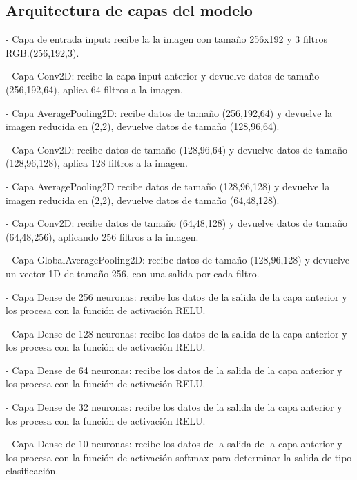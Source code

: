 \documentclass[colorinlistoftodos,twoside,twocolumn,10pt]{article} %
\begin{document}
\subsection{Arquitectura de capas del modelo}
- Capa de entrada input: recibe la la imagen con tamaño 256x192 y 3 filtros RGB.(256,192,3).

- Capa Conv2D: recibe la capa input anterior y devuelve datos de tamaño (256,192,64), aplica 64 filtros a la imagen.

- Capa AveragePooling2D: recibe datos de tamaño (256,192,64) y devuelve la imagen reducida en (2,2), devuelve datos de tamaño (128,96,64).

- Capa Conv2D: recibe datos de tamaño (128,96,64) y devuelve datos de tamaño (128,96,128), aplica 128 filtros a la imagen.

- Capa AveragePooling2D recibe datos de tamaño (128,96,128) y devuelve la imagen reducida en (2,2), devuelve datos de tamaño (64,48,128).

- Capa Conv2D: recibe datos de tamaño (64,48,128) y devuelve datos de tamaño (64,48,256), aplicando 256 filtros a la imagen.

- Capa GlobalAveragePooling2D: recibe datos de tamaño (128,96,128) y devuelve un vector 1D \cite{Machine Learning and Deep Learning methods for music genre Classification} de tamaño 256, con una salida por cada filtro.

- Capa Dense de 256 neuronas: recibe los datos de la salida de la capa anterior y los procesa con la función de activación RELU.

- Capa Dense de 128 neuronas: recibe los datos de la salida de la capa anterior y los procesa con la función de activación RELU.

- Capa Dense de 64 neuronas: recibe los datos de la salida de la capa anterior y los procesa con la función de activación RELU.

- Capa Dense de 32 neuronas: recibe los datos de la salida de la capa anterior y los procesa con la función de activación RELU.

- Capa Dense de 10 neuronas: recibe los datos de la salida de la capa anterior y los procesa con la función de activación softmax para determinar la salida de tipo clasificación.
\end{document}
